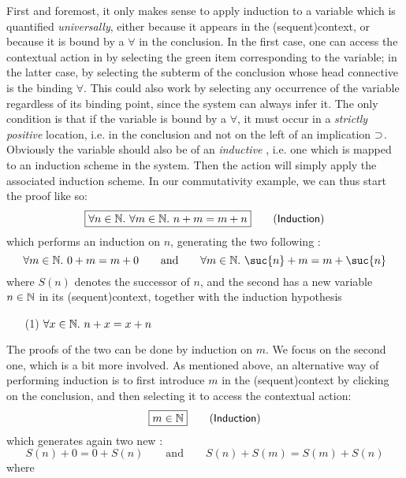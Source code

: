 First and foremost, it only makes sense to apply induction to a variable which
is quantified \emph{universally}, either because it appears in the \kl(sequent){context}, or
because it is bound by a $\forall$ in the conclusion. In the first case, one can
access the contextual action in  by selecting the green item corresponding
to the variable; in the latter case, by selecting the subterm of the conclusion
whose head connective is the binding $\forall$. This could also work by selecting any
occurrence of the variable regardless of its binding point, since the system can
always infer it. The only condition is that if the variable is bound by a
$\forall$, it must occur in a \emph{strictly positive} location, i.e. in the
conclusion and not on the left of an implication $\supset$. Obviously the variable
should also be of an \emph{inductive} , i.e. one which is mapped to an
induction scheme in the system. Then the 
action will simply apply the associated induction scheme. In our commutativity
example, we can thus start the proof like so:
$$\fbox{$\forall n \in \mathbb{N}.\ \forall m \in \mathbb{N}.\ n + m = m + n$} \qquad
\text{(\textsf{Induction})}$$
which performs an induction on $n$, generating the two following :
$$\forall m \in \nats.\ 0 + m = m + 0 \qquad \text{and} \qquad \forall m \in \nats.\ \suc{n} + m = m + \suc{n}$$
where $S(n)$ denotes the successor of $n$, and the second  has a new
variable $n \in \mathbb{N}$ in its \kl(sequent){context}, together with the induction hypothesis
\begin{itemize}
  \item[(1)] $\forall x \in \mathbb{N}.\ n + x = x + n$
\end{itemize}
The proofs of the two  can be done by induction on $m$. We focus on the
second one, which is a bit more involved. As mentioned above, an alternative way
of performing induction is to first introduce $m$ in the \kl(sequent){context} by clicking on
the conclusion, and then selecting it to access the contextual action:
$$\fbox{$m \in \mathbb{N}$} \qquad \text{(\textsf{Induction})}$$
which generates again two new :
$$S(n) + 0 = 0 + S(n) \qquad \text{and} \qquad S(n) + S(m) = S(m) + S(n)$$ where
